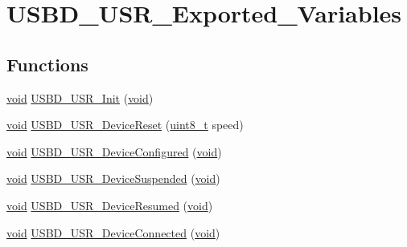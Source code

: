 \hypertarget{group___u_s_b_d___u_s_r___exported___variables}{\section{U\-S\-B\-D\-\_\-\-U\-S\-R\-\_\-\-Exported\-\_\-\-Variables}
\label{group___u_s_b_d___u_s_r___exported___variables}
}
\subsection*{Functions}
\begin{DoxyCompactItemize}
\item 
\hyperlink{group___n_a_m_e_ga18028b8badbf1ea7e704ccac3c488e82}{void} \hyperlink{group___u_s_b_d___u_s_r___exported___variables_ga439704d4d2254602e672f6ce0528e3eb}{U\-S\-B\-D\-\_\-\-U\-S\-R\-\_\-\-Init} (\hyperlink{group___n_a_m_e_ga18028b8badbf1ea7e704ccac3c488e82}{void})
\item 
\hyperlink{group___n_a_m_e_ga18028b8badbf1ea7e704ccac3c488e82}{void} \hyperlink{group___u_s_b_d___u_s_r___exported___variables_gac10ea223f86ed47e7619b25ab71ed83a}{U\-S\-B\-D\-\_\-\-U\-S\-R\-\_\-\-Device\-Reset} (\hyperlink{stdint_8h_aba7bc1797add20fe3efdf37ced1182c5}{uint8\-\_\-t} speed)
\item 
\hyperlink{group___n_a_m_e_ga18028b8badbf1ea7e704ccac3c488e82}{void} \hyperlink{group___u_s_b_d___u_s_r___exported___variables_ga8fad6d5efb792b500cfd1f5d0c970351}{U\-S\-B\-D\-\_\-\-U\-S\-R\-\_\-\-Device\-Configured} (\hyperlink{group___n_a_m_e_ga18028b8badbf1ea7e704ccac3c488e82}{void})
\item 
\hyperlink{group___n_a_m_e_ga18028b8badbf1ea7e704ccac3c488e82}{void} \hyperlink{group___u_s_b_d___u_s_r___exported___variables_ga62204dce5d51990ef90d52f0c8efc9a7}{U\-S\-B\-D\-\_\-\-U\-S\-R\-\_\-\-Device\-Suspended} (\hyperlink{group___n_a_m_e_ga18028b8badbf1ea7e704ccac3c488e82}{void})
\item 
\hyperlink{group___n_a_m_e_ga18028b8badbf1ea7e704ccac3c488e82}{void} \hyperlink{group___u_s_b_d___u_s_r___exported___variables_ga811ae379ad06261ef3fdbd123cff427e}{U\-S\-B\-D\-\_\-\-U\-S\-R\-\_\-\-Device\-Resumed} (\hyperlink{group___n_a_m_e_ga18028b8badbf1ea7e704ccac3c488e82}{void})
\item 
\hyperlink{group___n_a_m_e_ga18028b8badbf1ea7e704ccac3c488e82}{void} \hyperlink{group___u_s_b_d___u_s_r___exported___variables_gac680d8462dc3339d7f5a84378957cfd2}{U\-S\-B\-D\-\_\-\-U\-S\-R\-\_\-\-Device\-Connected} (\hyperlink{group___n_a_m_e_ga18028b8badbf1ea7e704ccac3c488e82}{void})

\end{DoxyCompactItemize}

